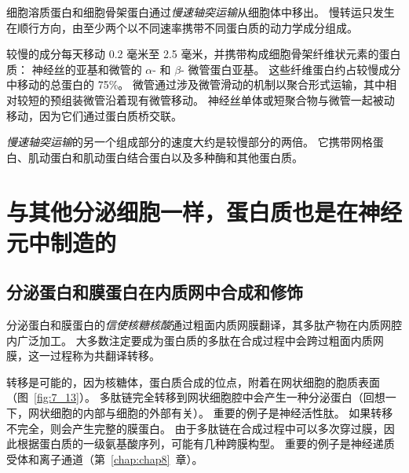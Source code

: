 细胞溶质蛋白和细胞骨架蛋白通过\textit{慢速轴突运输}从细胞体中移出。
慢转运只发生在顺行方向，由至少两个以不同速率携带不同蛋白质的动力学成分组成。


较慢的成分每天移动 0.2 毫米至 2.5 毫米，并携带构成细胞骨架纤维状元素的蛋白质：
神经丝的亚基和微管的 $\alpha$- 和 $\beta$- 微管蛋白亚基。
这些纤维蛋白约占较慢成分中移动的总蛋白的 75\%。 
微管通过涉及微管滑动的机制以聚合形式运输，其中相对较短的预组装微管沿着现有微管移动。
神经丝单体或短聚合物与微管一起被动移动，因为它们通过蛋白质桥交联。


\textit{慢速轴突运输}的另一个组成部分的速度大约是较慢部分的两倍。
它携带网格蛋白、肌动蛋白和肌动蛋白结合蛋白以及多种酶和其他蛋白质。



\section{与其他分泌细胞一样，蛋白质也是在神经元中制造的}

\subsection{分泌蛋白和膜蛋白在内质网中合成和修饰}

分泌蛋白和膜蛋白的\textit{信使核糖核酸}通过粗面内质网膜翻译，其多肽产物在内质网腔内广泛加工。
大多数注定要成为蛋白质的多肽在合成过程中会跨过粗面内质网膜，这一过程称为共翻译转移。


转移是可能的，因为核糖体，蛋白质合成的位点，附着在网状细胞的胞质表面（图~\ref{fig:7_13}）。
多肽链完全转移到网状细胞腔中会产生一种分泌蛋白（回想一下，网状细胞的内部与细胞的外部有关）。
重要的例子是神经活性肽。
如果转移不完全，则会产生完整的膜蛋白。
由于多肽链在合成过程中可以多次穿过膜，因此根据蛋白质的一级氨基酸序列，可能有几种跨膜构型。
重要的例子是神经递质受体和离子通道（第~\ref{chap:chap8}~章）。


